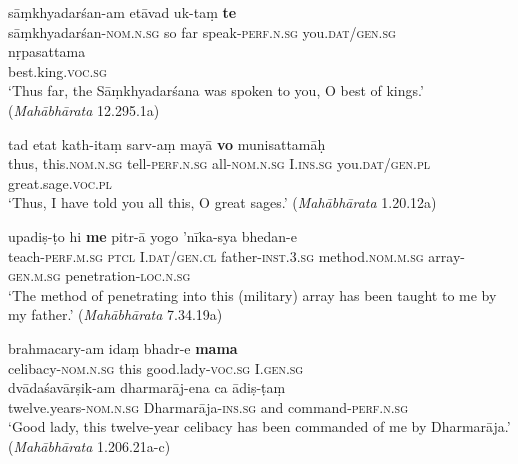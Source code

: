 \documentclass[output=paper,
modfonts
]{LSP/langsci}
\begin{document}
\begin{exe}
\ex\label{ex:hij}
\begin{xlist}
\ex\label{ex:samkh}\gll sāṃkhyadarśan-am etāvad uk-taṃ \textbf{te} \\
sāṃkhyadarśan-\textsc{nom.n.sg} {so far} speak-\textsc{perf.n.sg} you.\textsc{dat/gen.sg}  \\

\gll nṛpasattama \\ 
best.king.\textsc{voc.sg} \\
\glt `Thus far, the Sāṃkhyadarśana was spoken to you, O best of kings.' (\textit{Mahābhārata} 12.295.1a)

\ex\label{ex:tad}\gll tad etat kath-itaṃ sarv-aṃ mayā \textbf{vo} munisattamāḥ \\
thus, this.\textsc{nom.n.sg} tell-\textsc{perf.n.sg} all-\textsc{nom.n.sg} I.\textsc{ins.sg} you.\textsc{dat/gen.pl} great.sage.\textsc{voc.pl} \\
\glt `Thus, I have told you all this, O great sages.'  (\textit{Mahābhārata} 1.20.12a)

\ex\label{ex:upadisto}\gll upadiṣ-ṭo hi \textbf{me} pitr-ā yogo 'nīka-sya bhedan-e \\ teach-\textsc{perf.m.sg} \textsc{ptcl} I.\textsc{dat/gen.cl} father-\textsc{inst.3.sg} method.\textsc{nom.m.sg} array-\textsc{gen.m.sg} penetration-\textsc{loc.n.sg} \\
\glt `The method of penetrating into this (military) array has been taught to me by my father.'   (\textit{Mahābhārata}  7.34.19a)

\ex\label{ex:brahmacaryam}\gll brahmacary-am idaṃ bhadr-e \textbf{mama} \\
celibacy-\textsc{nom.n.sg} this good.lady-\textsc{voc.sg} I.\textsc{gen.sg}\\

\gll dvādaśavārṣik-am dharmarāj-ena ca ādiṣ-ṭaṃ \\
twelve.years-\textsc{nom.n.sg} Dharmarāja-\textsc{ins.sg} and command-\textsc{perf.n.sg} \\  \glt `Good lady, this  twelve-year celibacy  has been commanded of me by Dharmarāja.' (\textit{Mahābhārata} 1.206.21a-c)
\end{xlist}
\end{exe}
\end{document}
